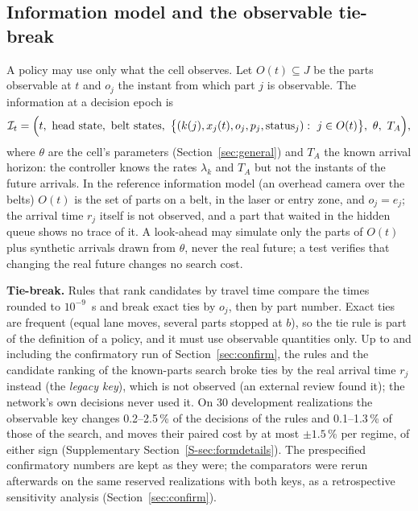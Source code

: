 \documentclass[11pt,a4paper]{article}
\theoremstyle{plain}
\theoremstyle{definition}
\theoremstyle{remark}
\newcommand{\I}{\mathcal I}
\newcommand{\Supp}[1]{Supplementary Section~\ref{S-#1}}
\begin{document}
\subsection{Information model and the observable tie-break}\label{sec:info}
A policy may use only what the cell observes. Let $O(t)\subseteq J$ be the parts observable
at $t$ and $o_j$ the instant from which part $j$ is observable. The information at a
decision epoch is
\begin{equation}\label{eq:info}
\I_t=\Bigl(t,\ \text{head state},\ \text{belt states},\
\bigl\{(k(j),x_j(t),o_j,p_j,\text{status}_j):\ j\in O(t)\bigr\},\ \theta,\ T_A\Bigr),
\end{equation}
where $\theta$ are the cell's parameters (Section~\ref{sec:general}) and $T_A$ the known
arrival horizon: the controller knows the rates $\lambda_k$ and $T_A$ but not the instants
of the future arrivals. In the reference information model (an overhead camera over the
belts) $O(t)$ is the set of parts on a belt, in the laser or entry zone, and $o_j=e_j$; the
arrival time $r_j$ itself is not observed, and a part that waited in the hidden queue shows
no trace of it. A look-ahead may simulate only the parts of $O(t)$ plus synthetic arrivals
drawn from $\theta$, never the real future; a test verifies that changing the real future
changes no search cost.

\textbf{Tie-break.} Rules that rank candidates by travel time compare the times rounded to
$10^{-9}$~s and break exact ties by $o_j$, then by part number. Exact ties are frequent
(equal lane moves, several parts stopped at $b$), so the tie rule is part of the
definition of a policy, and it must use observable quantities only. Up to and including the
confirmatory run of Section~\ref{sec:confirm}, the rules and the candidate ranking of the
known-parts search broke ties by the real arrival time $r_j$ instead (the \emph{legacy
key}), which is not observed (an external review found it); the network's own decisions
never used it. On 30 development realizations the observable key changes 0.2--2.5\,\% of
the decisions of the rules and 0.1--1.3\,\% of those of the search, and moves their paired
cost by at most $\pm1.5$\,\% per regime, of either sign (\Supp{sec:formdetails}). The
prespecified confirmatory numbers are kept as they were; the comparators were rerun
afterwards on the same reserved realizations with both keys, as a retrospective
sensitivity analysis (Section~\ref{sec:confirm}).
\end{document}
